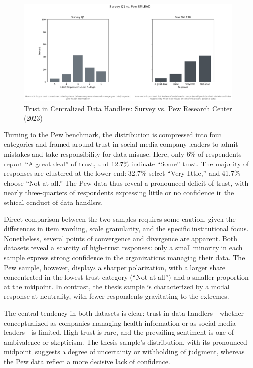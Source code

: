 		\begin{figure}[h!]\centering
			\includegraphics[width=0.7\linewidth]{figures/img/pew_comparison_plots/compare_1_vs_SMLEAD.png}
			\caption{Trust in Centralized Data Handlers: Survey vs. Pew Research Center (2023)}
			\label{fig:trust_pew_comparison}
		\end{figure}
		
		Turning to the Pew benchmark, the distribution is compressed into four categories and framed around trust in social media company leaders to admit mistakes and take responsibility for data misuse. Here, only 6\% of respondents report “A great deal” of trust, and 12.7\% indicate “Some” trust. The majority of responses are clustered at the lower end: 32.7\% select “Very little,” and 41.7\% choose “Not at all.” The Pew data thus reveal a pronounced deficit of trust, with nearly three-quarters of respondents expressing little or no confidence in the ethical conduct of data handlers.
		
		Direct comparison between the two samples requires some caution, given the differences in item wording, scale granularity, and the specific institutional focus. Nonetheless, several points of convergence and divergence are apparent. Both datasets reveal a scarcity of high-trust responses: only a small minority in each sample express strong confidence in the organizations managing their data. The Pew sample, however, displays a sharper polarization, with a larger share concentrated in the lowest trust category (“Not at all”) and a smaller proportion at the midpoint. In contrast, the thesis sample is characterized by a modal response at neutrality, with fewer respondents gravitating to the extremes.
		
		The central tendency in both datasets is clear: trust in data handlers—whether conceptualized as companies managing health information or as social media leaders—is limited. High trust is rare, and the prevailing sentiment is one of ambivalence or skepticism. The thesis sample’s distribution, with its pronounced midpoint, suggests a degree of uncertainty or withholding of judgment, whereas the Pew data reflect a more decisive lack of confidence.
		
